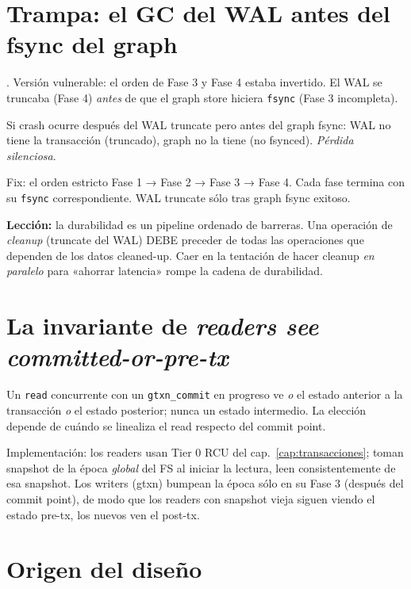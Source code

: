 \section{Trampa: el GC del WAL antes del fsync del graph}

\begin{trampa}
. Versión vulnerable: el orden de Fase 3 y
Fase 4 estaba invertido. El WAL se truncaba (Fase 4) \emph{antes}
de que el graph store hiciera \texttt{fsync} (Fase 3 incompleta).

Si crash ocurre después del WAL truncate pero antes del graph
fsync: WAL no tiene la transacción (truncado), graph no la
tiene (no fsynced). \emph{Pérdida silenciosa}.

Fix: el orden estricto Fase 1 → Fase 2 → Fase 3 → Fase 4. Cada
fase termina con su \texttt{fsync} correspondiente. WAL truncate
sólo tras graph fsync exitoso.

\textbf{Lección:} la durabilidad es un pipeline ordenado de
barreras. Una operación de \emph{cleanup} (truncate del WAL)
DEBE preceder de todas las operaciones que dependen de los
datos cleaned-up. Caer en la tentación de hacer cleanup
\emph{en paralelo} para «ahorrar latencia» rompe la cadena de
durabilidad.
\end{trampa}

\section{La invariante de \emph{readers see committed-or-pre-tx}}

\begin{invariante}
\label{inv:read-iso}
Un \texttt{read} concurrente con un \texttt{gtxn\_commit} en
progreso ve \emph{o} el estado anterior a la transacción \emph{o}
el estado posterior; nunca un estado intermedio. La elección
depende de cuándo se linealiza el read respecto del commit
point.
\end{invariante}

Implementación: los readers usan Tier 0 RCU del
cap.~\ref{cap:transacciones}; toman snapshot de la época
\emph{global} del FS al iniciar la lectura, leen consistentemente
de esa snapshot. Los writers (gtxn) bumpean la época sólo en
su Fase 3 (después del commit point), de modo que los readers
con snapshot vieja siguen viendo el estado pre-tx, los nuevos
ven el post-tx.

\section{Origen del diseño}

